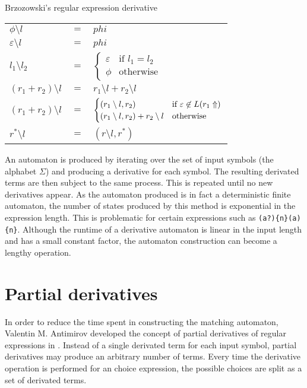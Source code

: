 \begin{defn}
   \label{defn-deriv}
   Brzozowski's regular expression derivative

   \begin{tabular}{lrl}
      $\phi \setminus l$	& $=$	& $phi$	\\
      $\varepsilon \setminus l$	& $=$	& $phi$	\\
      $l_1 \setminus l_2$	& $=$	&
          $\begin{cases}
             \varepsilon & \text{if } l_1 = l_2 \\
             \phi & \text{otherwise}
          \end{cases}$	\\
      $(r_1 + r_2) \setminus l$	& $=$	& $r_1 \setminus l + r_2 \setminus l$	\\
      $(r_1 + r_2) \setminus l$	& $=$	&
          $\begin{cases}
             (r_1 \setminus l, r_2) & \text{if } \varepsilon \not\in L(r_1\Uparrow) \\
             (r_1 \setminus l, r_2) + r_2 \setminus l & \text{otherwise}
          \end{cases}$	\\
      $r^* \setminus l$		& $=$	& $(r \setminus l, r^*)$	\\
   \end{tabular}
\end{defn}

An automaton is produced by iterating over the set of input symbols (the
alphabet $\Sigma$) and producing a derivative for each symbol. The resulting
derivated terms are then subject to the same process. This is repeated until no
new derivatives appear. As the automaton produced is in fact a deterministic
finite automaton, the number of states produced by this method is exponential in
the expression length. This is problematic for certain expressions such as
\verb!(a?){n}(a){n}!. Although the runtime of a derivative automaton is linear
in the input length and has a small constant factor, the automaton construction
can become a lengthy operation.


\section{Partial derivatives}

In order to reduce the time spent in constructing the matching automaton,
Valentin M. Antimirov developed the concept of partial derivatives of regular
expressions in \cite{antimirov}. Instead of a single derivated term for each
input symbol, partial derivatives may produce an arbitrary number of terms.
Every time the derivative operation is performed for an choice expression, the
possible choices are split as a set of derivated terms.

